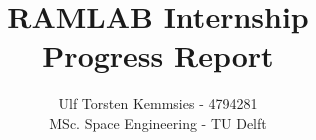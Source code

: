 \documentclass{homework}
\title{RAMLAB Internship \\ Progress Report}
\author{Ulf Torsten Kemmsies - 4794281  \\
MSc. Space Engineering - TU Delft}
\begin{document}
\maketitle




\begin{multicols}{2} %




% 

% 

% 

% 

% 

% 


% 





\end{multicols}
\end{document}
